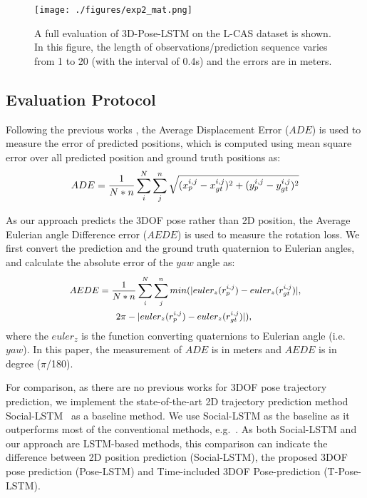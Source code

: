 \documentclass[letterpaper, 10 pt, conference]{ieeeconf}  %
\begin{document}
\begin{figure}[t]
\centering
\texttt{[image: ./figures/exp2\_mat.png]}
\caption{A full evaluation of 3D-Pose-LSTM on the L-CAS dataset is shown. In this figure, the length of observations/prediction sequence varies from 1 to 20 (with the interval of 0.4s) and the errors are in meters. }
\label{fig:exp2_mat}
\end{figure}
\subsection{Evaluation Protocol}
Following the previous works \cite{ETH,IGP,social-lstm,context-lstm,SDD}, the Average Displacement Error ($ADE$) is used to measure the error of predicted positions, which is computed using mean square error over all predicted position and ground truth positions as: 
\begin{equation}
\small
ADE = \frac{1}{N*n} \sum_i^{N} \sum_j^{n} \sqrt{(x_p^{i,j}-x_{gt}^{i,j})^2 + (y_p^{i,j}-y_{gt}^{i,j})^2}
\end{equation}

As our approach predicts the 3DOF pose rather than 2D position, the Average Eulerian angle Difference error ($AEDE$) is used to measure the rotation loss. We first convert the prediction and the ground truth quaternion to Eulerian angles, and calculate the absolute error of the $yaw$ angle as:
\begin{equation}
\small
\begin{split}
AEDE = \frac{1}{N*n} \sum_i^{N} \sum_j^{n} min( \vert euler_z(r_{p}^{i,j}) - euler_z(r_{gt}^{i,j}) \vert, \\
2\pi - \vert euler_z(r_{p}^{i,j}) - euler_z(r_{gt}^{i,j}) \vert ),~~~~~~~~~~~~~~~~
\end{split}
\end{equation}
\noindent where the $euler_z$ is the function converting quaternions to Eulerian angle (i.e. $yaw$). In this paper, the measurement of $ADE$ is in meters and $AEDE$ is in degree ($\pi$/180).

For comparison, as there are no previous works for 3DOF pose trajectory prediction, we implement the state-of-the-art 2D trajectory prediction method Social-LSTM~\cite{social-lstm} as a baseline method. We use Social-LSTM as the baseline as it outperforms most of the conventional methods, e.g.~\cite{UCY,ETH,IGP,yamaguchi2011you,SDD,grewal2011kalman}. As both Social-LSTM and our approach are LSTM-based methods, this comparison can indicate the difference between 2D position prediction (Social-LSTM), the proposed 3DOF pose prediction (Pose-LSTM) and Time-included 3DOF Pose-prediction (T-Pose-LSTM).
\end{document}
